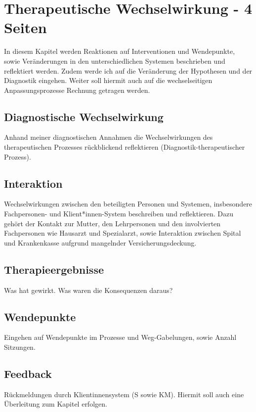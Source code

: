 \section{Therapeutische Wechselwirkung - 4 Seiten} \label{TherapeutischeWechselwirkung}
In diesem Kapitel werden Reaktionen auf Interventionen und Wendepunkte, sowie Veränderungen in den unterschiedlichen Systemen beschrieben und reflektiert werden. Zudem werde ich auf die Veränderung der Hypothesen und der Diagnostik eingehen. Weiter soll hiermit auch auf die wechselseitigen Anpassungsprozesse Rechnung getragen werden. 

\subsection{Diagnostische Wechselwirkung} Anhand meiner diagnostischen Annahmen die Wechselwirkungen des therapeutischen Prozesses rückblickend reflektieren (Diagnostik-therapeutischer Prozess). 
\subsection{Interaktion} Wechselwirkungen zwischen den beteiligten Personen und Systemen, insbesondere Fachpersonen- und Klient*innen-System beschreiben und reflektieren. Dazu gehört der Kontakt zur Mutter, den Lehrpersonen und den involvierten Fachpersonen wie Hausarzt und Spezialarzt, sowie Interaktion zwischen Spital und Krankenkasse aufgrund mangelnder Versicherungsdeckung.
\subsection{Therapieergebnisse} Was hat gewirkt. Was waren die Konsequenzen daraus?
\subsection{Wendepunkte} Eingehen auf Wendepunkte im Prozesse und Weg-Gabelungen, sowie Anzahl Sitzungen.
\subsection{Feedback} Rückmeldungen durch Klientinnensystem (S sowie KM). Hiermit soll auch eine Überleitung zum Kapitel  erfolgen.